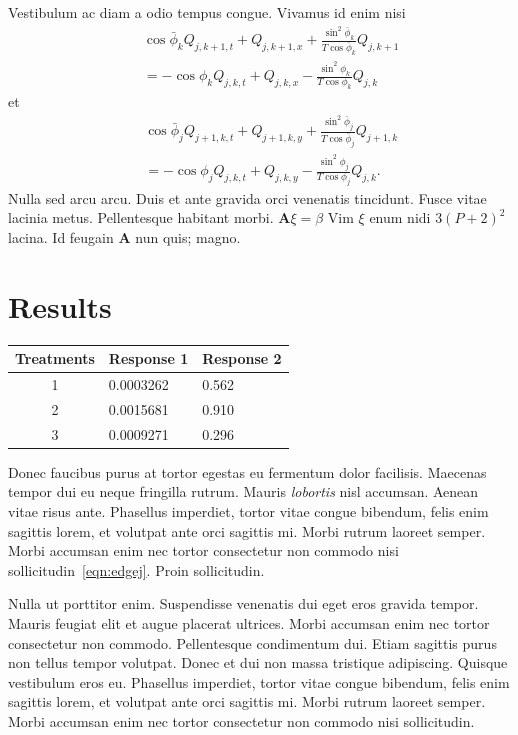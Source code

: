 \documentclass[12pt,a4paper]{article}\def\nCols{1}
\begin{document}
Vestibulum ac diam a odio tempus congue. Vivamus id enim nisi \cite{Smith:2013jd}
\begin{eqnarray}
&&\cos\bar{\phi}_k Q_{j,k+1,t} + Q_{j,k+1,x}+\frac{\sin^2\bar{\phi}_k}{T\cos\bar{\phi}_k} Q_{j,k+1} 
\nonumber\\&&{}
= -\cos\phi_k Q_{j,k,t} + Q_{j,k,x}-\frac{\sin^2\phi_k}{T\cos\phi_k} Q_{j,k}\label{eqn:edgek}
\end{eqnarray}
et
\begin{eqnarray}
&&\cos\bar{\phi}_j Q_{j+1,k,t} + Q_{j+1,k,y}+\frac{\sin^2\bar{\phi}_j}{T\cos\bar{\phi}_j} Q_{j+1,k}
\nonumber \\&&{}
= -\cos\phi_j Q_{j,k,t} + Q_{j,k,y}-\frac{\sin^2\phi_j}{T\cos\phi_j} Q_{j,k}.\label{eqn:edgej}
\end{eqnarray} 
Nulla sed arcu arcu. Duis et ante gravida orci venenatis tincidunt. Fusce vitae lacinia metus. Pellentesque habitant morbi. $\mathbf{A}{\xi}={\beta}$ Vim ${\xi}$ enum nidi $3(P+2)^{2}$ lacina. Id feugain $\mathbf{A}$ nun quis; magno.








\section{Results}

\begin{table} 
\begin{tabular}{cll}
\hline
{Treatments} & {Response 1} & {Response 2}\\
\hline
 1 & 0.0003262 & 0.562 \\
 2 & 0.0015681 & 0.910 \\
 3 & 0.0009271 & 0.296 \\
\hline
\end{tabular}
\end{table}
%
Donec faucibus purus at tortor egestas eu fermentum dolor facilisis. Maecenas tempor dui eu neque fringilla rutrum. Mauris \emph{lobortis} nisl accumsan. Aenean vitae risus ante.
Phasellus imperdiet, tortor vitae congue bibendum, felis enim sagittis lorem, et volutpat ante orci sagittis mi. Morbi rutrum laoreet semper. Morbi accumsan enim nec tortor consectetur non commodo nisi sollicitudin~\eqref{eqn:edgej}.  Proin sollicitudin. 

Nulla ut porttitor enim. Suspendisse venenatis dui eget eros gravida tempor. Mauris feugiat elit et augue placerat ultrices. Morbi accumsan enim nec tortor consectetur non commodo. Pellentesque condimentum dui. Etiam sagittis purus non tellus tempor volutpat. Donec et dui non massa tristique adipiscing. Quisque vestibulum eros eu. Phasellus imperdiet, tortor vitae congue bibendum, felis enim sagittis lorem, et volutpat ante orci sagittis mi. Morbi rutrum laoreet semper. Morbi accumsan enim nec tortor consectetur non commodo nisi sollicitudin.
\end{document}
